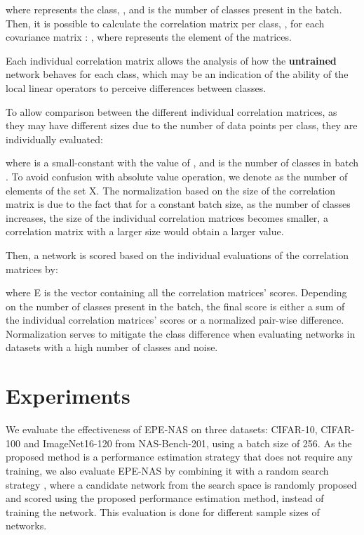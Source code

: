 \documentclass[10pt, conference]{IEEEtran}
\begin{document}
\noindent where  represents the class, , and  is the number of classes present in the batch. Then, it is possible to calculate the correlation matrix per class, , for each covariance matrix : , where  represents the  element of the matrices.

Each individual correlation matrix allows the analysis of how the \textbf{untrained} network behaves for each class, which may be an indication of the ability of the local linear operators to perceive differences between classes.

To allow comparison between the different individual correlation matrices, as they may have different sizes due to the number of data points per class, they are individually evaluated:



\noindent where  is a small-constant with the value of , and  is the number of classes in batch . To avoid confusion with absolute value operation, we denote  as the number of elements of the set X.
The normalization based on the size of the correlation matrix is due to the fact that for a constant batch size, as the number of classes increases, the size of the individual correlation matrices becomes smaller, a correlation matrix with a larger size would obtain a larger value.

Then, a network is scored based on the individual evaluations of the correlation matrices by:



\noindent where E is the vector containing all the correlation matrices' scores. Depending on the number of classes present in the batch, the final score is either a sum of the individual correlation matrices' scores or a normalized pair-wise difference. Normalization serves to mitigate the class difference when evaluating networks in datasets with a high number of classes and noise.







\hfill
\section{Experiments}
\label{experiments}
We evaluate the effectiveness of EPE-NAS on three datasets: CIFAR-10, CIFAR-100 and ImageNet16-120 from NAS-Bench-201, using a batch size of 256. As the proposed method is a performance estimation strategy that does not require any training, we also evaluate EPE-NAS by combining it with a random search strategy \cite{li2020random}, where a candidate network from the search space is randomly proposed and scored using the proposed performance estimation method, instead of training the network. This evaluation is done for different sample sizes of  networks.
\end{document}
